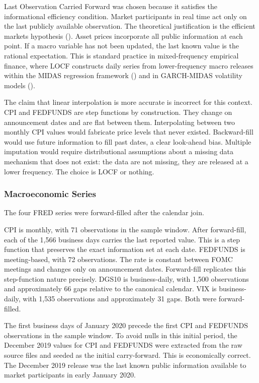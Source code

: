 Last Observation Carried Forward was chosen because it satisfies the informational efficiency condition. Market participants in real time act only on the last publicly available observation. The theoretical justification is the efficient markets hypothesis (\cite{fama1970}). Asset prices incorporate all public information at each point. If a macro variable has not been updated, the last known value is the rational expectation. This is standard practice in mixed-frequency empirical finance, where LOCF constructs daily series from lower-frequency macro releases within the MIDAS regression framework (\cite{ghysels2004}) and in GARCH-MIDAS volatility models (\cite{conrad2020}).

The claim that linear interpolation is more accurate is incorrect for this context. CPI and FEDFUNDS are step functions by construction. They change on announcement dates and are flat between them. Interpolating between two monthly CPI values would fabricate price levels that never existed. Backward-fill would use future information to fill past dates, a clear look-ahead bias. Multiple imputation would require distributional assumptions about a missing data mechanism that does not exist: the data are not missing, they are released at a lower frequency. The choice is LOCF or nothing.

\subsubsection{Macroeconomic Series}

The four FRED series were forward-filled after the calendar join.

CPI is monthly, with 71 observations in the sample window. After forward-fill, each of the 1,566 business days carries the last reported value. This is a step function that preserves the exact information set at each date. FEDFUNDS is meeting-based, with 72 observations. The rate is constant between FOMC meetings and changes only on announcement dates. Forward-fill replicates this step-function nature precisely. DGS10 is business-daily, with 1,500 observations and approximately 66 gaps relative to the canonical calendar. VIX is business-daily, with 1,535 observations and approximately 31 gaps. Both were forward-filled.

The first business days of January 2020 precede the first CPI and FEDFUNDS observations in the sample window. To avoid nulls in this initial period, the December 2019 values for CPI and FEDFUNDS were extracted from the raw source files and seeded as the initial carry-forward. This is economically correct. The December 2019 release was the last known public information available to market participants in early January 2020.

